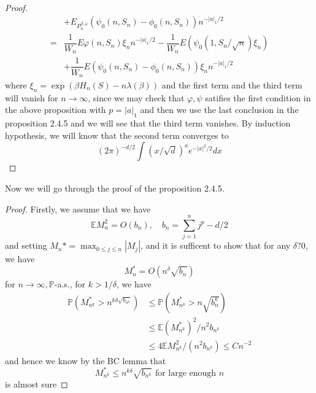 \begin{proof}
\[\begin{aligned}
        &+ E_{P^{\beta,\omega}_n}(\psi_0(n,S_n) - \phi_0(n,S_n))n^{-|a|_1/2} \\
        =& \dfrac{1}{W_n}E\varphi(n,S_n)\xi_n n^{-|a|_1/2} - \dfrac{1}{W_n}E(\psi_0(1,S_n/\sqrt{n})\xi_n) \\
        &+ \dfrac{1}{W_n}E(\psi_0(n,S_n) - \phi_0(n,S_n))\xi_n n^{-|a|_1/2}
    \end{aligned}
    \]
    where $\xi_n = \exp(\beta H_n(S)- n\lambda(\beta))$ and the first term and the third term will vanish for $n \to \infty$, since we may check that $\varphi, \psi$ satifies the first condition in the above proposition with $p= |a|_1$ and then we use the last conclusion in the proposition 2.4.5 and we will see that the third term vanishes. By induction hypothesis, we will know that the second term converges to
    \[
    (2\pi)^{-d/2}\int (x/\sqrt{d})^a e^{-|x|^2/2}dx
    \]
\end{proof}

Now we will go through the proof of the proposition 2.4.5.

\begin{proof}
    Firstly, we assume that we have
    \[
    \mathbb{E} M_n^2 = O(b_n),\quad b_n = \sum\limits_{j=1}^n j^p-{d/2}
    \]
    and setting $M_n* = \max_{0\leq j\leq n} |M_j|$, and it is sufficent to show that for any $\delta ? 0$, we have
    \[
    M_n^* = O(n^{\delta}\sqrt{b_n})
    \]
    for $n\to\infty, \mathbb{P}$-a.s., for $k> 1/\delta$, we have
    \[
    \begin{aligned}
        \mathbb{P}(M_{n^k}^* > n^{k\delta \sqrt{b_{n^k}}}) &\leq \mathbb{P}(M_{n^k}^* > n\sqrt{b_n^k}) \\
        &\leq \mathbb{E}(M_{n^k}^*)^2 / n^2b_{n^k} \\
        &\leq 4\mathbb{E}M_{n^k}^2 / (n^2b_{n^k}) \leq Cn^{-2}
    \end{aligned}
    \]
    and hence we know by the BC lemma that
    \[
    M_{n^k}^* \leq n^{k\delta} \sqrt{b_{n^k}}\text{ for large enough }n
    \]
    is almost sure
\end{proof}